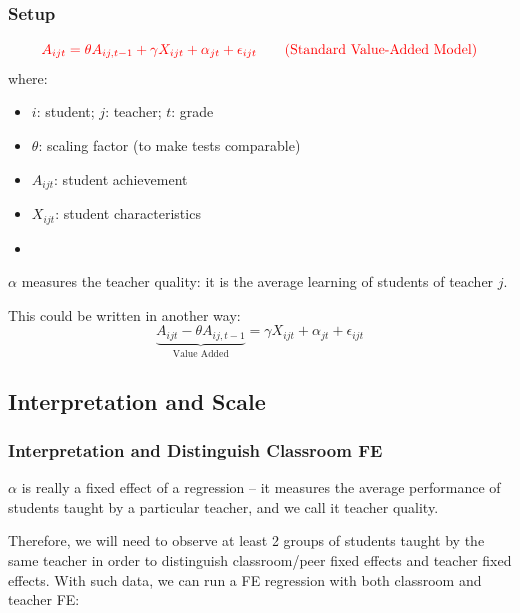         \subsubsection{Setup}
            \begin{equation}
                \color{red}
                A_{ijt} = \theta A_{ij,t-1} + \gamma X_{ijt} + \alpha_{jt} + \epsilon_{ijt}
                \tag{Standard Value-Added Model}
                \label{eqn:edu_value_add_m}
            \end{equation}
            where:
            \begin{itemize}
                \item $i$: student; $j$: teacher; $t$: grade
                \item $\theta$: scaling factor (to make tests comparable)
                \item $A_{ijt}$: student achievement
                \item $X_{ijt}$: student characteristics
                \item {}
            \end{itemize}
            $\alpha$ measures the teacher quality: it is the average learning of students of teacher $j$.
            
            This could be written in another way:
            \begin{equation*}
                \underbrace{A_{ijt} - \theta A_{ij,t-1}}_{\text{Value Added}} = \gamma X_{ijt} + \alpha_{jt} + \epsilon_{ijt}
            \end{equation*}
        
    \subsection{Interpretation and Scale}
        
        \subsubsection{Interpretation and Distinguish Classroom FE}
            $\alpha$ is really a fixed effect of a regression -- it measures the average performance of students taught by a particular teacher, and we call it teacher quality. 
            
            Therefore, we will need to observe at least 2 groups of students taught by the same teacher in order to distinguish classroom/peer fixed effects and teacher fixed effects. With such data, we can run a FE regression with both classroom and teacher FE:
            
